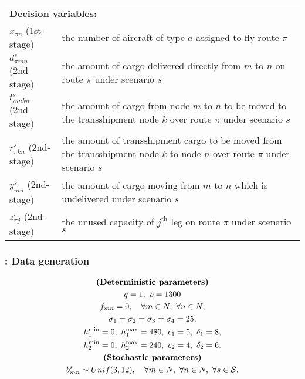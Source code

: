\begin{table}[H]
{\begin{tabular}{ll}
			\multicolumn{2}{l}{\textbf{Decision variables:}} \\
			$x_{\pi a}$ (1st-stage) & the number of aircraft of type $a$ assigned to fly route $\pi$\\
			$d_{\pi mn}^s$ (2nd-stage)& the amount of cargo delivered directly from $m$ to $n$ on route $\pi$ under scenario $s$\\
			$t_{\pi m k n}^s$ (2nd-stage)& the amount of cargo from node $m$ to $n$ to be moved to the transshipment node $k$ over route $\pi$ under scenario $s$\\
			$r_{\pi kn}^s$ (2nd-stage)& the amount of transshipment cargo to be moved from the transshipment node $k$ to node $n$ over route $\pi$ under scenario $s$\\
			$y_{mn}^s$ (2nd-stage)& the amount of cargo moving from $m$ to $n$ which is undelivered under scenario $s$\\
			$z_{\pi j}^s$ (2nd-stage)& the unused capacity of $j^{\textrm{th}}$ leg on route $\pi$ under scenario $s$\\ 
			\bottomrule
		\end{tabular}
	}
\end{table} 

\subsubsection{\cargo: Data generation}
\begin{gather*}
\textbf{\textrm{(Deterministic parameters)}}\\
q=1,\ \rho=1300\\
f_{mn}=0,\quad\forall m\in N,\ \forall n\in N,\\
\sigma_1=\sigma_2=\sigma_3=\sigma_4=25,\\
h_1^{\textrm{min}}=0,\ h_1^{\textrm{max}}=480,\ c_1=5,\ \delta_1=8,\\
h_2^{\textrm{min}}=0,\ h_2^{\textrm{max}}=240,\ c_2=4,\ \delta_2=6.\\
\textbf{\textrm{(Stochastic parameters)}}\\
b_{mn}^s\sim Unif(3,12),\quad\forall m\in N,\ \forall n\in N,\ \forall s\in\mathcal{S}.
\end{gather*}

